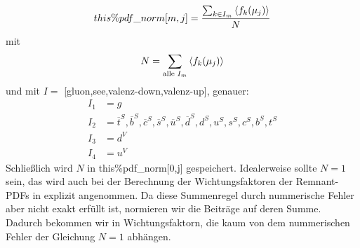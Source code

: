 \begin{equation}
  this\%pdf\_norm[m,j]=\frac{\sum_{k\in I_m}\left<f_k(\mu_j)\right>}{N}
\end{equation}
mit
\begin{equation}
  N=\sum_{\text{alle } I_m}\left<f_k(\mu_j)\right>
\end{equation}
und mit $I=$ [gluon,see,valenz-down,valenz-up], genauer:
\begin{align}
  I_1&=g\\
  I_2&={\overline{t}^S,\overline{b}^S,\overline{c}^S,\overline{s}^S,\overline{u}^S,\overline{d}^S,d^S,u^S,s^S,c^S,b^S,t^S}\\
  I_3&=d^V\\
  I_4&=u^V
\end{align}
Schließlich wird $N$ in this\%pdf\_norm[0,j] gespeichert. Idealerweise sollte $N=1$ sein, das wird auch bei der Berechnung der Wichtungsfaktoren der Remnant-PDFs in  explizit angenommen. Da diese Summenregel durch nummerische Fehler aber nicht exakt erfüllt ist, normieren wir die Beiträge auf deren Summe. Dadurch bekommen wir in  Wichtungsfaktorn, die kaum von dem nummerischen Fehler der Gleichung $N=1$ abhängen.

